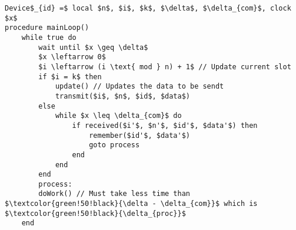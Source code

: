 \begin{minipage}{\linewidth} %

\begin{lstlisting}[style=pseudocode,mathescape=true,caption={Pseudocode example of the main loop}] 
Device$_{id} =$ local $n$, $i$, $k$, $\delta$, $\delta_{com}$, clock $x$ 
procedure mainLoop()
    while true do
        wait until $x \geq \delta$
        $x \leftarrow 0$
        $i \leftarrow (i \text{ mod } n) + 1$ // Update current slot
        if $i = k$ then
            update() // Updates the data to be sendt
            transmit($i$, $n$, $id$, $data$)
        else 
            while $x \leq \delta_{com}$ do
                if received($i'$, $n'$, $id'$, $data'$) then
                    remember($id'$, $data'$)
                    goto process
                end
            end
        end
        process:
        doWork() // Must take less time than $\textcolor{green!50!black}{\delta - \delta_{com}}$ which is $\textcolor{green!50!black}{\delta_{proc}}$    
    end
\end{lstlisting}  
\end{minipage}
            